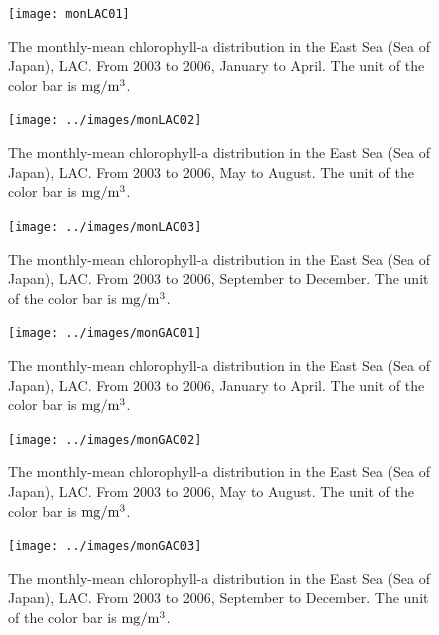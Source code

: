 \begin{figure}[h]
	\centering
	\texttt{[image: monLAC01]}\\
	\scriptsize\caption{The monthly-mean chlorophyll-a distribution in the East Sea (Sea of Japan), LAC. From 2003 to 2006, January to April. The unit of the color bar is $\rm mg/m^3$.}
	\label{fig:monLAC01}
\end{figure}


\begin{figure}[h]
	\centering
	\texttt{[image: ../images/monLAC02]}\\
	\scriptsize\caption{The monthly-mean chlorophyll-a distribution in the East Sea (Sea of Japan), LAC. From 2003 to 2006, May to August. The unit of the color bar is $\rm mg/m^3$.}
	\label{fig:monLAC02}
\end{figure}

\begin{figure}[h]
	\centering
	\texttt{[image: ../images/monLAC03]}\\
	\scriptsize\caption{The monthly-mean chlorophyll-a distribution in the East Sea (Sea of Japan), LAC. From 2003 to 2006, September to December. The unit of the color bar is $\rm mg/m^3$.}
	\label{fig:monLAC03}
\end{figure}


\begin{figure}[h]
	\centering
	\texttt{[image: ../images/monGAC01]}\\
	\scriptsize\caption{The monthly-mean chlorophyll-a distribution in the East Sea (Sea of Japan), LAC. From 2003 to 2006, January to April. The unit of the color bar is $\rm mg/m^3$.}
	\label{fig:monGAC01}
\end{figure}


\begin{figure}[h]
	\centering
	\texttt{[image: ../images/monGAC02]}\\
	\scriptsize\caption{The monthly-mean chlorophyll-a distribution in the East Sea (Sea of Japan), LAC. From 2003 to 2006, May to August. The unit of the color bar is $\rm mg/m^3$.}
	\label{fig:monGAC02}
\end{figure}


\begin{figure}[h]
	\centering
	\texttt{[image: ../images/monGAC03]}\\
	\scriptsize\caption{The monthly-mean chlorophyll-a distribution in the East Sea (Sea of Japan), LAC. From 2003 to 2006, September to December. The unit of the color bar is $\rm mg/m^3$.}
	\label{fig:monGAC03}
\end{figure}


